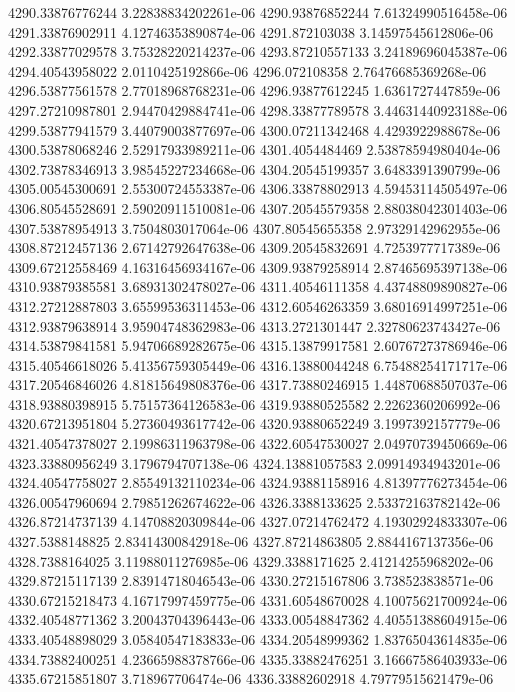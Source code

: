{4290.33876776244 3.22838834202261e-06
4290.93876852244 7.61324990516458e-06
4291.33876902911 4.12746353890874e-06
4291.872103038 3.14597545612806e-06
4292.33877029578 3.75328220214237e-06
4293.87210557133 3.24189696045387e-06
4294.40543958022 2.0110425192866e-06
4296.072108358 2.76476685369268e-06
4296.53877561578 2.77018968768231e-06
4296.93877612245 1.6361727447859e-06
4297.27210987801 2.94470429884741e-06
4298.33877789578 3.44631440923188e-06
4299.53877941579 3.44079003877697e-06
4300.07211342468 4.4293922988678e-06
4300.53878068246 2.52917933989211e-06
4301.4054484469 2.53878594980404e-06
4302.73878346913 3.98545227234668e-06
4304.20545199357 3.6483391390799e-06
4305.00545300691 2.55300724553387e-06
4306.33878802913 4.59453114505497e-06
4306.80545528691 2.59020911510081e-06
4307.20545579358 2.88038042301403e-06
4307.53878954913 3.7504803017064e-06
4307.80545655358 2.97329142962955e-06
4308.87212457136 2.67142792647638e-06
4309.20545832691 4.7253977717389e-06
4309.67212558469 4.16316456934167e-06
4309.93879258914 2.87465695397138e-06
4310.93879385581 3.68931302478027e-06
4311.40546111358 4.43748809890827e-06
4312.27212887803 3.65599536311453e-06
4312.60546263359 3.68016914997251e-06
4312.93879638914 3.95904748362983e-06
4313.2721301447 2.32780623743427e-06
4314.53879841581 5.94706689282675e-06
4315.13879917581 2.60767273786946e-06
4315.40546618026 5.41356759305449e-06
4316.13880044248 6.75488254171717e-06
4317.20546846026 4.81815649808376e-06
4317.73880246915 1.44870688507037e-06
4318.93880398915 5.75157364126583e-06
4319.93880525582 2.2262360206992e-06
4320.67213951804 5.27360493617742e-06
4320.93880652249 3.1997392157779e-06
4321.40547378027 2.19986311963798e-06
4322.60547530027 2.04970739450669e-06
4323.33880956249 3.1796794707138e-06
4324.13881057583 2.09914934943201e-06
4324.40547758027 2.85549132110234e-06
4324.93881158916 4.81397776273454e-06
4326.00547960694 2.79851262674622e-06
4326.3388133625 2.53372163782142e-06
4326.87214737139 4.14708820309844e-06
4327.07214762472 4.19302924833307e-06
4327.5388148825 2.83414300842918e-06
4327.87214863805 2.8844167137356e-06
4328.7388164025 3.11988011276985e-06
4329.3388171625 2.41214255968202e-06
4329.87215117139 2.83914718046543e-06
4330.27215167806 3.738523838571e-06
4330.67215218473 4.16717997459775e-06
4331.60548670028 4.10075621700924e-06
4332.40548771362 3.20043704396443e-06
4333.00548847362 4.40551388604915e-06
4333.40548898029 3.05840547183833e-06
4334.20548999362 1.83765043614835e-06
4334.73882400251 4.23665988378766e-06
4335.33882476251 3.16667586403933e-06
4335.67215851807 3.718967706474e-06
4336.33882602918 4.79779515621479e-06
}
